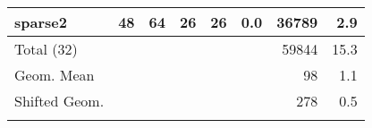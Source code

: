\documentclass[leqno]{article}
\begin{document}
\begin{center}
\begin{supertabular*}{\textwidth}{@{\extracolsep{\fill}}lrrrrrrr@{}}
sparse2             &     48 &     64 &               26 &               26 &    0.0 &     36789 &      2.9\\
\midrule
Total          (32) &        &        &                &                &        &     59844 &     15.3\\
Geom. Mean          &        &        &                &                &        &        98 &      1.1\\
Shifted Geom.       &        &        &                &                &        &       278 &      0.5 \\
\noalign{\vspace{6pt}}
\end{supertabular*}
\end{center}
\end{document}
